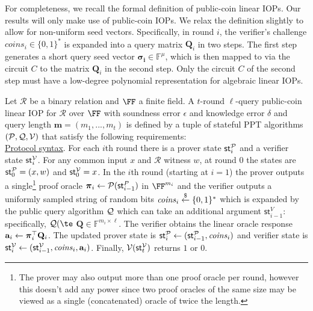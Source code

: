 For completeness, we recall the formal definition of public-coin linear IOPs. Our results will only make use of public-coin IOPs. We relax the definition slightly to allow for non-uniform seed vectors. Specifically, in round $i$, the verifier's challenge $\mathit{coins}_i \in \{0,1\}^*$ is expanded into a query matrix $\mathbf{Q}_i$ in two steps. The first step generates a short query seed vector $\boldsymbol{\sigma_i} \in \mathbb{F}^\mu$, which is then mapped to via the circuit $C$ to the matrix $\mathbf{Q}_i$ in the second step. Only the circuit $C$ of the second step must have a low-degree polynomial representation for algebraic linear IOPs.

\begin{definition} 
\label{def:linearIOP}
Let $\mathcal{R}$ be a binary relation and $\FF$ a finite field. A $t$-round $\ell$-query public-coin linear IOP for $\mathcal{R}$ over $\FF$ with soundness error $\epsilon$ and knowledge error $\delta$ and query length $\mathbf{m} = (m_1,...,m_t)$ is defined by a tuple of stateful PPT algorithms $(\mathcal{P}, \mathcal{Q}, \mathcal{V})$ that satisfy the following requirements:\\
 
\noindent \underline{Protocol syntax}. 
For each $i$th round there is a prover state $\textsf{st}^\mathcal{P}_i$ and a verifier state $\textsf{st}^\mathcal{V}_i$. For any common input $x$ and $\mathcal{R}$ witness $w$, at round 0 the states are $\textsf{st}^\mathcal{P}_0 = (x, w)$ and $\textsf{st}^\mathcal{V}_0 = x$. 
In the $i$th round (starting at $i = 1$) the prover outputs a single\footnote{The prover may also output more than one proof oracle per round, however this doesn't add any power since two proof oracles of the same size may be viewed as a single (concatenated) oracle of twice the length.} proof oracle $\boldsymbol{\pi}_i \leftarrow \mathcal{P}(\textsf{st}^P_{i-1})$ in $\FF^{m_i}$ and the verifier outputs a uniformly sampled string of random bits $\mathit{coins}_i \overset{\$}{\gets} \{0,1\}^*$ which is expanded by the public query algorithm $\mathcal{Q}$ which can take an additional argument $\textsf{st}^V_{i-1}$: specifically, $\qgen(\te$ $\mathbf{Q} \in \mathbb{F}^{m_i \times \ell}$.
The verifier obtains the linear oracle response $\mathbf{a}_i \leftarrow \boldsymbol{\pi}_i^\top \mathbf{Q}_i$. The updated prover state is $\textsf{st}^\mathcal{P}_i \leftarrow (\textsf{st}^\mathcal{P}_{i-1}, \mathit{coins}_i)$ and verifier state is $\textsf{st}^\mathcal{V}_i \leftarrow (\textsf{st}^\mathcal{V}_{i-1}, \mathit{coins}_i, \mathbf{a}_i)$. Finally, $\mathcal{V}(\textsf{st}^\mathcal{V}_t)$ returns $1$ or $0$. \\ 


\end{definition}
